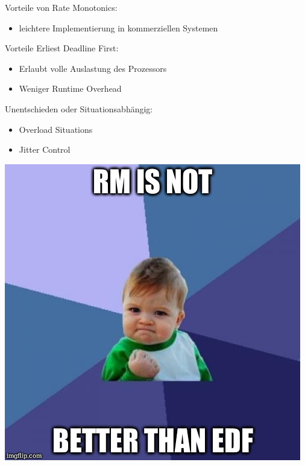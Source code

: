 \begin{frame}{\secname}
	Vorteile von Rate Monotonics:
	\begin{itemize}
		\item leichtere Implementierung in kommerziellen Systemen
	\end{itemize}
	Vorteile Erliest Deadline First:
	\begin{itemize}
		\item Erlaubt volle Auslastung des Prozessors %
		\item Weniger Runtime Overhead
	\end{itemize}
	Unentschieden oder Situationsabhängig:
	\begin{itemize}
		\item Overload Situations
		\item Jitter Control
	\end{itemize}
\end{frame}

\begin{frame}{\secname}
	\begin{center}
		\includegraphics[scale=0.35]{graphics/memes/success.jpg}
	\end{center}
\end{frame}